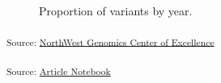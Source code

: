 \documentclass[
  twocolumn]{article}
\begin{document}
\begin{figure}[H]


\caption{\label{fig-countprop}Proportion of variants by year.}

\end{figure}%

\textsubscript{Source:
\href{https://coe-test-org.github.io/sitrep-demo/notebooks/nwcoe-preview.html\#cell-fig-countprop}{NorthWest
Genomics Center of Excellence}}

\textsubscript{Source:
\href{https://coe-test-org.github.io/sitrep-demo/index.qmd.html}{Article
Notebook}}
\end{document}
